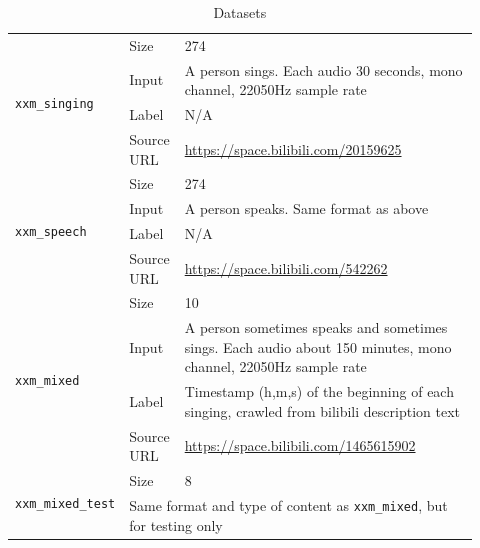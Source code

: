 \documentclass{article}
\begin{document}
    \begin{table}[h]
        \begin{tabular}{|p{0.15\linewidth}|p{0.12\linewidth}|p{0.65\linewidth}|}
            \hline
            \multirow{4}{\linewidth}{\lstinline|xxm_singing|} & Size & 274 \\ \cline{2-3}
            & Input & A person sings. Each audio 30 seconds, mono channel, 22050Hz sample rate \\ \cline{2-3}
            & Label & N/A \\ \cline{2-3}
            & Source URL & \url{https://space.bilibili.com/20159625} \\ \hline
            \multirow{4}{\linewidth}{\lstinline|xxm_speech|} & Size & 274 \\ \cline{2-3}
            & Input & A person speaks. Same format as above \\ \cline{2-3}
            & Label & N/A \\ \cline{2-3}
            & Source URL & \url{https://space.bilibili.com/542262} \\ \hline
            \multirow{4}{\linewidth}{\lstinline|xxm_mixed|} & Size & 10 \\ \cline{2-3} 
            & Input & A person sometimes speaks and sometimes sings. Each audio about 150 minutes, mono channel, 22050Hz sample rate \\ \cline{2-3}
            & Label & Timestamp (h,m,s) of the beginning of each singing, crawled from bilibili description text \\ \cline{2-3}
            & Source URL & \url{https://space.bilibili.com/1465615902} \\ \hline
            \multirow{2}{\linewidth}{\lstinline|xxm_mixed_test|} & Size & 8 \\ \cline{2-3}
            & \multicolumn{2}{l|}{Same format and type of content as \lstinline|xxm_mixed|, but for testing only}\\ \hline
        \end{tabular}
        \caption{Datasets}
        \label{dataset}
    \end{table}

\end{document}
